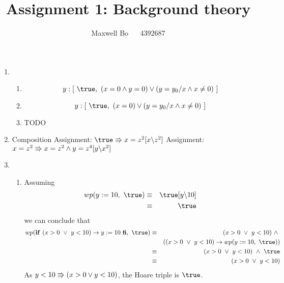 \documentclass{article}
\title{\bf Assignment 1: Background theory}
\author{Maxwell Bo  ~~ 4392687}
\begin{document}
\maketitle

\begin{enumerate}
    \item 
        \begin{enumerate}
            \item \[ y: [\ \true,\ (x = 0 \land y = 0) \lor (y = y_0 / x \land x \neq 0)\ ]\]
            \item \[ y: [\ \true,\ (x = 0) \lor (y = y_0 / x \land x \neq 0)\ ]\]
            \item TODO
        \end{enumerate}

    \item 
        \DERIVE
         {Composition}
         {Assignment: $\true \entails x = z^2 [x \backslash z^2]$}
         {Assignment: $x = z^2 \Rrightarrow x = z^2 \land y = z ^ 4[y \backslash x^2]$}
        \ENDDERIVE

    \item
        \begin{enumerate}
            \item Assuming
                \begin{eqnarray*}
                    wp(y := 10,\ \true) & \equiv & \true[y \backslash 10]\\
                                       & \equiv & \true
                \end{eqnarray*} 
                    we can conclude that 
                \begin{eqnarray*}
                    wp(\If\ (x > 0 ~\lor~ y < 10) \rightarrow y:= 10\ \Fi,\ \true) & \equiv & (x > 0 ~\lor~ y < 10) ~\land~ \\
                        & & ((x > 0 ~\lor~ y < 10) \rightarrow wp(y := 10,\ \true))\\
                    & \equiv & (x > 0 ~\lor~ y < 10) ~\land~ \true\\
                    & \equiv & (x > 0 ~\lor~ y < 10)
                \end{eqnarray*}
                As $y < 10 \Rrightarrow (x > 0 \lor y < 10)$, the Hoare triple is $\true$.


\end{enumerate}
\end{enumerate}
\end{document}
